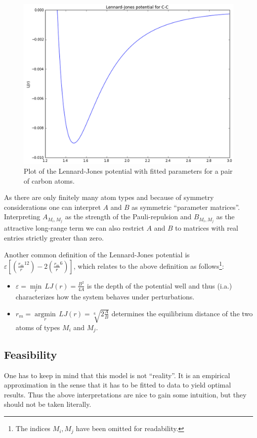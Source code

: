 \documentclass[12pt]{article}
\theoremstyle{definition}\newtheorem*{definition}{Definition}
\theoremstyle{definition}\newtheorem*{remark}{Remark}
\begin{document}
\begin{figure}
\caption{Plot of the Lennard-Jones potential with fitted parameters for a pair of carbon atoms.}
\includegraphics[width=1\linewidth]{LJ.png}
\end{figure}

As there are only finitely many atom types and because of symmetry considerations one can interpret $A$ and $B$ as symmetric ``parameter matrices''. Interpreting $A_{M_i,M_j}$ as the strength of the Pauli-repulsion and $B_{M_i,M_j}$ as the attractive long-range term we can also restrict $A$ and $B$ to matrices with real entries strictly greater than zero.

Another common definition of the Lennard-Jones potential is $\varepsilon\left[\left(\frac{r_m}{r}^{12}\right)-2\left(\frac{r_m}{r}^6\right) \right]$, which relates to the above definition as follows\footnote{The indices ${M_i,M_j}$ have been omitted for readability.}:

\begin{itemize}
	\item $\varepsilon = \underset{r}{\operatorname{min}}\,LJ(r) = \frac{B^2}{4A}$ is the depth of the potential well and thus (i.a.) characterizes how the system behaves under perturbations.
	\item $r_m = \underset{r}{\operatorname{argmin}}\,LJ(r) = \sqrt[6]{2\frac{A}{B}}$ determines the equilibrium distance of the two atoms of types $M_i$ and $M_j$.
\end{itemize}

\subsection{Feasibility}
One has to keep in mind that this model is not ``reality''. It is an empirical approximation in the sense that it has to be fitted to data to yield optimal results. Thus the above interpretations are nice to gain some intuition, but they should not be taken literally. 
\end{document}

